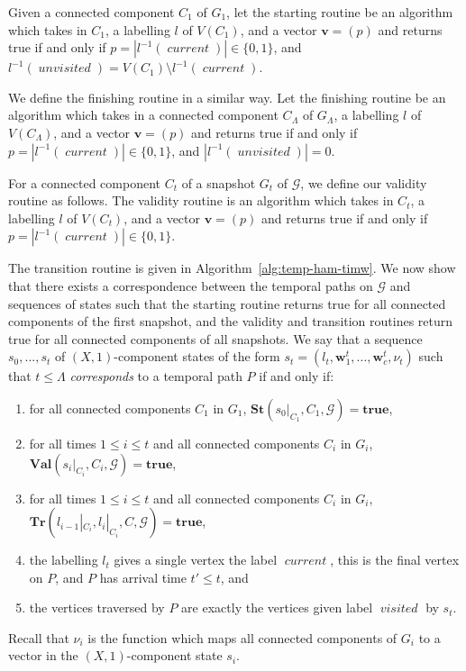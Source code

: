 \documentclass[a4paper,UKenglish,cleveref, autoref, thm-restate]{lipics-v2021} %
\DeclareMathOperator{\visited}{\textit{visited}}
\DeclareMathOperator{\unvisited}{\textit{unvisited}}
\DeclareMathOperator{\current}{\textit{current}}
\begin{document}
\begin{toappendix}
Given a connected component $C_1$ of $G_1$, let the starting routine be an algorithm which takes in $C_1$, a labelling $l$ of $V(C_1)$, and a vector $\textbf{v}=(p)$ and returns true if and only if $p=|l^{-1}(\current)|\in \{0,1\}$, and $l^{-1}(\unvisited)=V(C_1)\setminus l^{-1}(\current)$.

We define the finishing routine in a similar way. Let the finishing routine be an algorithm which takes in a connected component $C_{\Lambda}$ of $G_{\Lambda}$, a labelling $l$ of $V(C_{\Lambda})$, and a vector $\textbf{v}=(p)$ and returns true if and only if $p=|l^{-1}(\current)|\in \{0,1\}$, and $|l^{-1}(\unvisited)|=0$.

For a connected component $C_t$ of a snapshot $G_t$ of $\mathcal{G}$, we define our validity routine as follows. The validity routine is an algorithm which takes in $C_{t}$, a labelling $l$ of $V(C_t)$, and a vector $\textbf{v}=(p)$ and returns true if and only if $p=|l^{-1}(\current)|\in \{0,1\}$.

The transition routine is given in Algorithm~\ref{alg:temp-ham-timw}.
We now show that there exists a correspondence between the temporal paths on $\mathcal{G}$ and sequences of states such that the starting routine returns true for all connected components of the first snapshot, and the validity and transition routines return true for all connected components of all snapshots. We say that a sequence $s_0, ..., s_t$ of $(X,1)$-component states of the form $s_t=(l_t,\textbf{w}^t_1,\ldots,\textbf{w}^t_c, \nu_t)$ such that $t\leq\Lambda$ \textit{corresponds} to a temporal path $P$ if and only if:
\begin{enumerate}
    \item for all connected components $C_1$ in $G_1$, $\textbf{St}(s_0|_{C_1}, C_1,\mathcal{G})=\textbf{true}$,
    \item for all times $1\leq i\leq t$ and all connected components $C_{i}$ in $G_{i}$, $\textbf{Val}(s_{i}|_{C_{i}}, C_{i},\mathcal{G})=\textbf{true}$,
    \item for all times $1\leq i\leq t$ and all connected components $C_{i}$ in $G_{i}$, $\textbf{Tr}(l_{i-1}|_{C_i}, l_i|_{C_i}, C,\mathcal{G})=\textbf{true}$,
    \item the labelling $l_t$ gives a single vertex the label $\current$, this is the final vertex on $P$, and $P$ has arrival time $t' \leq t$, and
    \item the vertices traversed by $P$ are exactly the vertices given label $\visited$ by $s_t$. 
\end{enumerate}
Recall that $\nu_i$ is the function which maps all connected components of $G_i$ to a vector in the $(X,1)$-component state $s_i$.


\end{toappendix}
\end{document}

